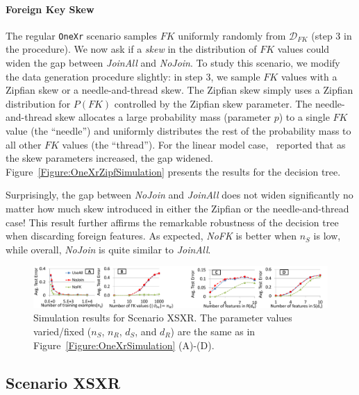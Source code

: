 \documentclass{vldb}
\begin{document}
\paragraph*{Foreign Key Skew}
The regular \texttt{OneXr} scenario samples $FK$ uniformly randomly from $\mathcal{D}_{FK}$ (step 3 in the procedure). We now ask if a \textit{skew} in 
the distribution of $FK$ values could widen the gap between \textit{JoinAll} and \textit{NoJoin}. To study this scenario, we modify the data generation procedure slightly:
in step 3, we sample $FK$ values with a Zipfian skew or a needle-and-thread skew. The Zipfian skew simply uses a Zipfian distribution for $P(FK)$ controlled by the Zipfian
skew parameter. The needle-and-thread skew allocates a large probability mass (parameter $p$) to a single $FK$ value (the ``needle'') and uniformly distributes the rest of 
the probability mass to all other $FK$ values (the ``thread''). For the linear model case,~\cite{hamlet} reported that as the skew parameters increased, the gap widened.
Figure~\ref{Figure:OneXrZipfSimulation} presents the results for the decision tree.

Surprisingly, the gap between \textit{NoJoin} and \textit{JoinAll} does not widen significantly no matter how much skew introduced in either the Zipfian or the 
needle-and-thread case! This result further affirms the remarkable robustness of the decision tree when discarding foreign features. As expected, 
\textit{NoFK} is better when $n_S$ is low, while overall, \textit{NoJoin} is quite similar to \textit{JoinAll}.


\begin{figure}[t]
\centering
\includegraphics[width=0.99\linewidth]{xsxr1.pdf}
\caption{Simulation results for Scenario XSXR. The parameter values varied/fixed ($n_S$, $n_R$, $d_S$, and $d_R$) are the same as in Figure~\ref{Figure:OneXrSimulation} (A)-(D).}
\label{Figure:XsXrSimulation}
\end{figure}

\subsection{Scenario XSXR}
\end{document}
